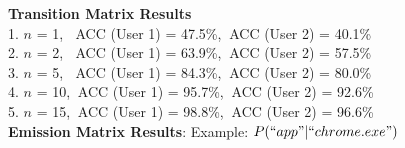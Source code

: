\documentclass[final]{beamer}
\newlength{\colwidth}
\begin{document}
\begin{frame}[t]
\begin{columns}[t]
\begin{column}{\colwidth}
\begin{block}
        \large {\textbf{Transition Matrix Results}}\\
        1. $n$ = 1,  $\>$  ACC (User 1) = 47.5\%, $\>$ACC (User 2) = 40.1\%\\
        2. $n$ = 2,  $\>$  ACC (User 1) = 63.9\%, $\>$ACC (User 2) = 57.5\%\\
        3. $n$ = 5,  $\>$  ACC (User 1) = 84.3\%, $\>$ACC (User 2) = 80.0\%\\
        4. $n$ = 10, $\>$ACC (User 1) = 95.7\%, $\>$ACC (User 2) = 92.6\%\\
        5. $n$ = 15, $\>$ACC (User 1) = 98.8\%, $\>$ACC (User 2) = 96.6\%\\
        \large {\textbf{Emission Matrix Results}}: Example: $P(``app" | ``chrome.exe")$
        \begin{figure}

\end{figure}
\end{block}
\end{column}
\end{columns}
\end{frame}
\end{document}
